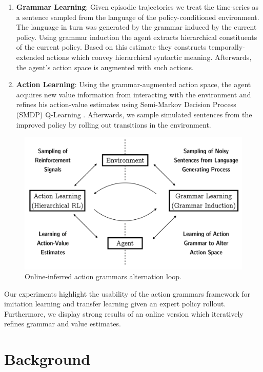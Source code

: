 \documentclass[10pt,letterpaper]{article}
\begin{document}
\begin{enumerate}
	\item \textbf{Grammar Learning}: Given episodic trajectories we treat the time-series as a sentence sampled from the language of the policy-conditioned environment. The language in turn was generated by the grammar induced by the current policy. Using grammar induction the agent extracts hierarchical constituents of the current policy. Based on this estimate they constructs temporally-extended actions which convey hierarchical syntactic meaning. Afterwards, the agent's action space is augmented with such actions. 
	\item \textbf{Action Learning}: Using the grammar-augmented action space, the agent acquires new value information from interacting with the environment and refines his action-value estimates using Semi-Markov Decision Process (SMDP) Q-Learning \cite{Bradtke_1995}. Afterwards, we sample simulated sentences from the improved policy by rolling out transitions in the environment.
\end{enumerate}

\begin{figure}
    \centering
    \includegraphics[width=\linewidth]{figures/concept_al_gl.png}
    \caption{Online-inferred action grammars alternation loop.}
    \label{fig:loop_ag}
\end{figure}

Our experiments highlight the usability of the action grammars framework for imitation learning and transfer learning given an expert policy rollout. Furthermore, we display strong results of an online version which iteratively refines grammar and value estimates. 

\section{Background}
\end{document}
